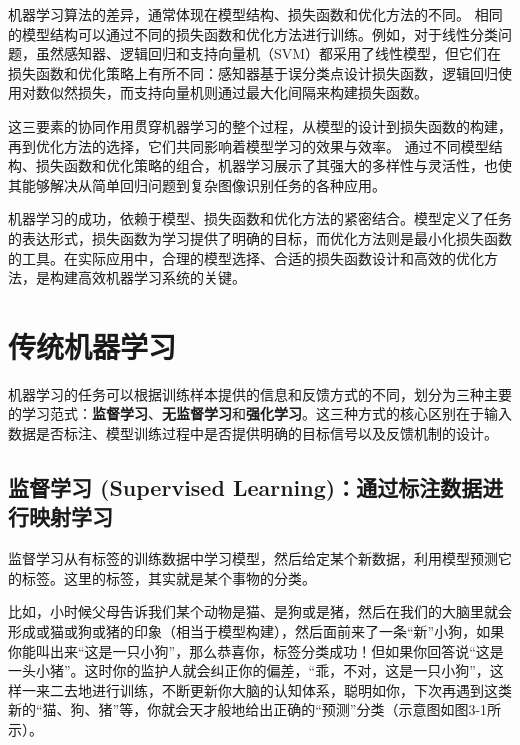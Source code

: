 机器学习算法的差异，通常体现在模型结构、损失函数和优化方法的不同。
相同的模型结构可以通过不同的损失函数和优化方法进行训练。例如，对于线性分类问题，虽然感知器、逻辑回归和支持向量机（SVM）都采用了线性模型，但它们在损失函数和优化策略上有所不同：感知器基于误分类点设计损失函数，逻辑回归使用对数似然损失，而支持向量机则通过最大化间隔来构建损失函数。

这三要素的协同作用贯穿机器学习的整个过程，从模型的设计到损失函数的构建，再到优化方法的选择，它们共同影响着模型学习的效果与效率。
通过不同模型结构、损失函数和优化策略的组合，机器学习展示了其强大的多样性与灵活性，也使其能够解决从简单回归问题到复杂图像识别任务的各种应用。

机器学习的成功，依赖于模型、损失函数和优化方法的紧密结合。模型定义了任务的表达形式，损失函数为学习提供了明确的目标，而优化方法则是最小化损失函数的工具。在实际应用中，合理的模型选择、合适的损失函数设计和高效的优化方法，是构建高效机器学习系统的关键。

 \section{传统机器学习}


机器学习的任务可以根据训练样本提供的信息和反馈方式的不同，划分为三种主要的学习范式：{\bf 监督学习}、{\bf 无监督学习}和{\bf 强化学习}。这三种方式的核心区别在于输入数据是否标注、模型训练过程中是否提供明确的目标信号以及反馈机制的设计。

\subsection{ 监督学习 (Supervised Learning)：通过标注数据进行映射学习}


监督学习从有标签的训练数据中学习模型，然后给定某个新数据，利用模型预测它的标签。这里的标签，其实就是某个事物的分类。

比如，小时候父母告诉我们某个动物是猫、是狗或是猪，然后在我们的大脑里就会形成或猫或狗或猪的印象（相当于模型构建），然后面前来了一条“新”小狗，如果你能叫出来“这是一只小狗”，那么恭喜你，标签分类成功！但如果你回答说“这是一头小猪”。这时你的监护人就会纠正你的偏差，“乖，不对，这是一只小狗”，这样一来二去地进行训练，不断更新你大脑的认知体系，聪明如你，下次再遇到这类新的“猫、狗、猪”等，你就会天才般地给出正确的“预测”分类（示意图如图3-1所示）。

